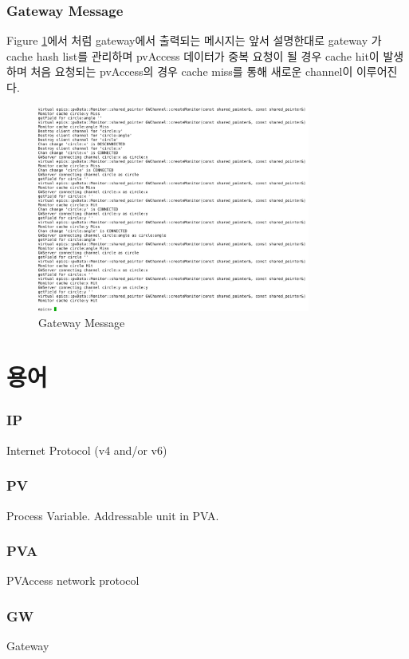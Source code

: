 \documentclass[11pt
  , a4paper
  , article
  , oneside
]{memoir}
\begin{document}
\clearpage
\subsubsection{Gateway Message}
Figure \ref{fig:gw_msg}에서 처럼 gateway에서 출력되는 메시지는 앞서 설명한대로 gateway 가 cache hash list를 관리하며 pvAccess 데이터가 중복 요청이 될 경우 cache hit이 발생하며 처음 요청되는 pvAccess의 경우 cache miss를 통해 새로운 channel이 이루어진다.

\begin{figure}[!htb]
	\centering
	\includegraphics[width=0.8\textwidth, height=0.5\textheight]{./images/gw_msg.png}
	\caption{
		Gateway Message
	}		
	\label{fig:gw_msg}   
\end{figure}

\clearpage
\section{용어}
\subsubsection{IP}
Internet Protocol (v4 and/or v6)

\subsubsection{PV}
Process Variable. Addressable unit in PVA.

\subsubsection{PVA}
PVAccess network protocol

\subsubsection{GW}
Gateway
\end{document}
